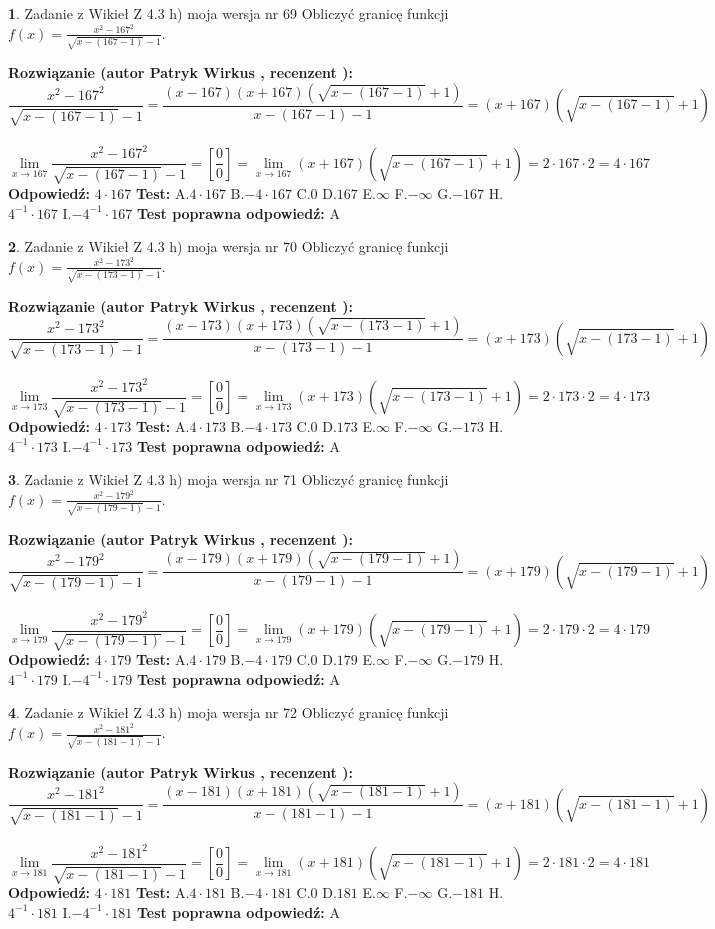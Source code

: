 \documentclass[12pt, a4paper]{article}
\theoremstyle{definition} %
\newtheorem{zad}{}
\newcommand{\zadStart}[1]{\begin{zad}#1\newline}
\newcommand{\zadStop}{\end{zad}}
\newcommand{\rozwStart}[2]{\noindent \textbf{Rozwiązanie (autor #1 , recenzent #2): }\newline}
\newcommand{\rozwStop}{\newline}
\newcommand{\odpStart}{\noindent \textbf{Odpowiedź:}\newline}
\newcommand{\odpStop}{\newline}
\newcommand{\testStart}{\noindent \textbf{Test:}\newline}
\newcommand{\testStop}{\newline}
\newcommand{\kluczStart}{\noindent \textbf{Test poprawna odpowiedź:}\newline}
\newcommand{\kluczStop}{\newline}
\begin{document}
\zadStart{Zadanie z Wikieł Z 4.3 h) moja wersja nr 69}
Obliczyć granicę funkcji $f(x)=\frac{x^{2} - 167^{2}}{\sqrt{x-(167-1)}-1}$.
\zadStop
\rozwStart{Patryk Wirkus}{}
$$\frac{x^{2} - 167^{2}}{\sqrt{x-(167-1)}-1}=\frac{(x-167)(x+167)(\sqrt{x-(167-1)}+1)}{x-(167-1)-1}=(x+167)(\sqrt{x-(167-1)}+1)$$
\\
$$\lim\limits_{x\to 167}\frac{x^{2} - 167^{2}}{\sqrt{x-(167-1)}-1}=[\frac{0}{0}]=
\lim\limits_{x\to 167}(x+167)(\sqrt{x-(167-1)}+1) = 2\cdot167 \cdot 2 = 4 \cdot 167$$
\rozwStop
\odpStart
$4\cdot167$
\odpStop
\testStart
A.$4\cdot167$
B.$-4\cdot167$
C.$0$
D.$167$
E.$\infty$
F.$-\infty$
G.$-167$
H.$4^{-1}\cdot167$
I.$-4^{-1}\cdot167$
\testStop
\kluczStart
A
\kluczStop



\zadStart{Zadanie z Wikieł Z 4.3 h) moja wersja nr 70}
Obliczyć granicę funkcji $f(x)=\frac{x^{2} - 173^{2}}{\sqrt{x-(173-1)}-1}$.
\zadStop
\rozwStart{Patryk Wirkus}{}
$$\frac{x^{2} - 173^{2}}{\sqrt{x-(173-1)}-1}=\frac{(x-173)(x+173)(\sqrt{x-(173-1)}+1)}{x-(173-1)-1}=(x+173)(\sqrt{x-(173-1)}+1)$$
\\
$$\lim\limits_{x\to 173}\frac{x^{2} - 173^{2}}{\sqrt{x-(173-1)}-1}=[\frac{0}{0}]=
\lim\limits_{x\to 173}(x+173)(\sqrt{x-(173-1)}+1) = 2\cdot173 \cdot 2 = 4 \cdot 173$$
\rozwStop
\odpStart
$4\cdot173$
\odpStop
\testStart
A.$4\cdot173$
B.$-4\cdot173$
C.$0$
D.$173$
E.$\infty$
F.$-\infty$
G.$-173$
H.$4^{-1}\cdot173$
I.$-4^{-1}\cdot173$
\testStop
\kluczStart
A
\kluczStop



\zadStart{Zadanie z Wikieł Z 4.3 h) moja wersja nr 71}
Obliczyć granicę funkcji $f(x)=\frac{x^{2} - 179^{2}}{\sqrt{x-(179-1)}-1}$.
\zadStop
\rozwStart{Patryk Wirkus}{}
$$\frac{x^{2} - 179^{2}}{\sqrt{x-(179-1)}-1}=\frac{(x-179)(x+179)(\sqrt{x-(179-1)}+1)}{x-(179-1)-1}=(x+179)(\sqrt{x-(179-1)}+1)$$
\\
$$\lim\limits_{x\to 179}\frac{x^{2} - 179^{2}}{\sqrt{x-(179-1)}-1}=[\frac{0}{0}]=
\lim\limits_{x\to 179}(x+179)(\sqrt{x-(179-1)}+1) = 2\cdot179 \cdot 2 = 4 \cdot 179$$
\rozwStop
\odpStart
$4\cdot179$
\odpStop
\testStart
A.$4\cdot179$
B.$-4\cdot179$
C.$0$
D.$179$
E.$\infty$
F.$-\infty$
G.$-179$
H.$4^{-1}\cdot179$
I.$-4^{-1}\cdot179$
\testStop
\kluczStart
A
\kluczStop



\zadStart{Zadanie z Wikieł Z 4.3 h) moja wersja nr 72}
Obliczyć granicę funkcji $f(x)=\frac{x^{2} - 181^{2}}{\sqrt{x-(181-1)}-1}$.
\zadStop
\rozwStart{Patryk Wirkus}{}
$$\frac{x^{2} - 181^{2}}{\sqrt{x-(181-1)}-1}=\frac{(x-181)(x+181)(\sqrt{x-(181-1)}+1)}{x-(181-1)-1}=(x+181)(\sqrt{x-(181-1)}+1)$$
\\
$$\lim\limits_{x\to 181}\frac{x^{2} - 181^{2}}{\sqrt{x-(181-1)}-1}=[\frac{0}{0}]=
\lim\limits_{x\to 181}(x+181)(\sqrt{x-(181-1)}+1) = 2\cdot181 \cdot 2 = 4 \cdot 181$$
\rozwStop
\odpStart
$4\cdot181$
\odpStop
\testStart
A.$4\cdot181$
B.$-4\cdot181$
C.$0$
D.$181$
E.$\infty$
F.$-\infty$
G.$-181$
H.$4^{-1}\cdot181$
I.$-4^{-1}\cdot181$
\testStop
\kluczStart
A
\kluczStop
\end{document}
